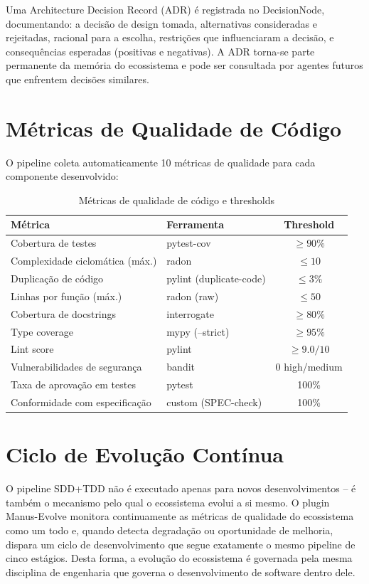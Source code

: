 \documentclass[12pt,a4paper,sumario=tradicional,openany]{abntex2}
\begin{document}
Uma Architecture Decision Record (ADR) é registrada no DecisionNode, documentando: a decisão de design tomada, alternativas consideradas e rejeitadas, racional para a escolha, restrições que influenciaram a decisão, e consequências esperadas (positivas e negativas). A ADR torna-se parte permanente da memória do ecossistema e pode ser consultada por agentes futuros que enfrentem decisões similares.

\section{Métricas de Qualidade de Código}

O pipeline coleta automaticamente 10 métricas de qualidade para cada componente desenvolvido:

\begin{table}[H]
\centering
\caption{Métricas de qualidade de código e thresholds}
\label{tab:code-quality}
\begin{tabular}{@{}llc@{}}
\toprule
\textbf{Métrica} & \textbf{Ferramenta} & \textbf{Threshold} \\
\midrule
Cobertura de testes & pytest-cov & $\geq 90\%$ \\
Complexidade ciclomática (máx.) & radon & $\leq 10$ \\
Duplicação de código & pylint (duplicate-code) & $\leq 3\%$ \\
Linhas por função (máx.) & radon (raw) & $\leq 50$ \\
Cobertura de docstrings & interrogate & $\geq 80\%$ \\
Type coverage & mypy (--strict) & $\geq 95\%$ \\
Lint score & pylint & $\geq 9.0/10$ \\
Vulnerabilidades de segurança & bandit & 0 high/medium \\
Taxa de aprovação em testes & pytest & 100\% \\
Conformidade com especificação & custom (SPEC-check) & 100\% \\
\bottomrule
\end{tabular}
\end{table}

\section{Ciclo de Evolução Contínua}

O pipeline SDD+TDD não é executado apenas para novos desenvolvimentos -- é também o mecanismo pelo qual o ecossistema evolui a si mesmo. O plugin Manus-Evolve monitora continuamente as métricas de qualidade do ecossistema como um todo e, quando detecta degradação ou oportunidade de melhoria, dispara um ciclo de desenvolvimento que segue exatamente o mesmo pipeline de cinco estágios. Desta forma, a evolução do ecossistema é governada pela mesma disciplina de engenharia que governa o desenvolvimento de software dentro dele.
\end{document}
